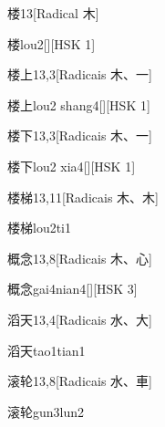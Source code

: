 \begin{entry}{楼}{13}[Radical ⽊]
  \begin{phonetics}{楼}{lou2}[][HSK 1]
  \end{phonetics}
\end{entry}

\begin{entry}{楼上}{13,3}[Radicais ⽊、⼀]
  \begin{phonetics}{楼上}{lou2 shang4}[][HSK 1]
  \end{phonetics}
\end{entry}

\begin{entry}{楼下}{13,3}[Radicais ⽊、⼀]
  \begin{phonetics}{楼下}{lou2 xia4}[][HSK 1]
  \end{phonetics}
\end{entry}

\begin{entry}{楼梯}{13,11}[Radicais ⽊、⽊]
  \begin{phonetics}{楼梯}{lou2ti1}
  \end{phonetics}
\end{entry}

\begin{entry}{概念}{13,8}[Radicais ⽊、⼼]
  \begin{phonetics}{概念}{gai4nian4}[][HSK 3]
  \end{phonetics}
\end{entry}

\begin{entry}{滔天}{13,4}[Radicais ⽔、⼤]
  \begin{phonetics}{滔天}{tao1tian1}
  \end{phonetics}
\end{entry}

\begin{entry}{滚轮}{13,8}[Radicais ⽔、⾞]
  \begin{phonetics}{滚轮}{gun3lun2}
  \end{phonetics}
\end{entry}

